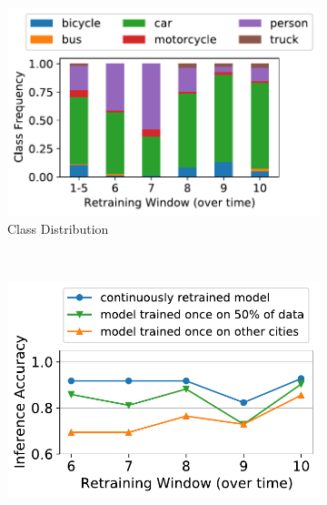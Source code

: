 \begin{figure}[t!]
  \centering
  \begin{subfigure}[t]{0.42\linewidth}
    \centering
    \includegraphics[width=\linewidth]{ekya/figures/motivation/incr_learn_motivation/motivation_cityscapes_zurich_classdist.pdf}
    \caption{Class Distribution}
    \label{fig:jena-classdist}
  \end{subfigure}
    ~~
  \begin{subfigure}[t]{0.42\linewidth}
    \centering
    \includegraphics[width=\linewidth]{ekya/figures/motivation/incr_learn_motivation/new_motivation_cityscapes_zurich_accuracy.pdf}
    

\end{subfigure}
\end{figure}
